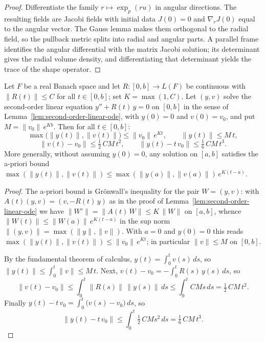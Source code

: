 \begin{proof}
\sketch
{}
Differentiate the family $r\mapsto\exp_p(ru)$ in angular directions. The resulting fields are Jacobi fields with initial data $J(0)=0$ and $\nabla_rJ(0)$ equal to the angular vector. The Gauss lemma makes them orthogonal to the radial field, so the pullback metric splits into radial and angular parts. A parallel frame identifies the angular differential with the matrix Jacobi solution; its determinant gives the radial volume density, and differentiating that determinant yields the trace of the shape operator.
\end{proof}

\begin{lemma}
\label{lem:jacobi-small-time}
\leanok



Let $F$ be a real Banach space and let $R\colon[0,b]\to L(F)$ be
continuous with $\|R(t)\|\le C$ for all $t\in[0,b]$; set
$K=\max(1,C)$. Let $(y,v)$ solve the second-order linear equation
$y''+R(t)\,y=0$ on $[0,b]$ in the sense of
Lemma~\ref{lem:second-order-linear-ode}, with $y(0)=0$ and
$v(0)=v_0$, and put $M=\|v_0\|\,e^{Kb}$. Then for all $t\in[0,b]$:
$$\max\bigl(\|y(t)\|,\|v(t)\|\bigr)\le\|v_0\|\,e^{Kt},\qquad
\|y(t)\|\le M\,t,$$
$$\|v(t)-v_0\|\le\tfrac12\,CM\,t^2,\qquad
\|y(t)-t\,v_0\|\le\tfrac16\,CM\,t^3.$$
More generally, without assuming $y(0)=0$, any solution on $[a,b]$
satisfies the a-priori bound
$\max(\|y(t)\|,\|v(t)\|)\le
\max(\|y(a)\|,\|v(a)\|)\,e^{K(t-a)}$.
\end{lemma}

\begin{proof}
\sketch
{}
\leanok
The a-priori bound is Gr\"onwall's inequality for the pair
$W=(y,v)$: with $A(t)(y,v)=(v,-R(t)\,y)$ as in the proof of
Lemma~\ref{lem:second-order-linear-ode} we have
$\|W'\|=\|A(t)\,W\|\le K\,\|W\|$ on $[a,b]$, whence
$\|W(t)\|\le\|W(a)\|\,e^{K(t-a)}$ in the sup norm
$\|(y,v)\|=\max(\|y\|,\|v\|)$. With $a=0$ and $y(0)=0$ this reads
$\max(\|y(t)\|,\|v(t)\|)\le\|v_0\|\,e^{Kt}$; in particular
$\|v\|\le M$ on $[0,b]$.

By the fundamental theorem of calculus,
$y(t)=\int_0^tv(s)\,ds$, so $\|y(t)\|\le\int_0^t\|v\|\le M\,t$.
Next, $v(t)-v_0=-\int_0^tR(s)\,y(s)\,ds$, so
$$\|v(t)-v_0\|\le\int_0^t\|R(s)\|\,\|y(s)\|\,ds
\le\int_0^tCMs\,ds=\tfrac12\,CM\,t^2.$$
Finally $y(t)-t\,v_0=\int_0^t\bigl(v(s)-v_0\bigr)\,ds$, so
$$\|y(t)-t\,v_0\|\le\int_0^t\tfrac12\,CMs^2\,ds
=\tfrac16\,CM\,t^3.$$
\end{proof}

